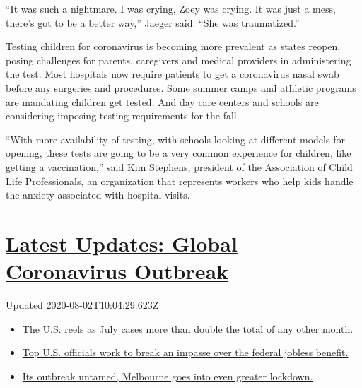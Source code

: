 ``It was such a nightmare. I was crying, Zoey was crying. It was just a
mess, there's got to be a better way,'' Jaeger said. ``She was
traumatized.''

Testing children for coronavirus is becoming more prevalent as states
reopen, posing challenges for parents, caregivers and medical providers
in administering the test. Most hospitals now require patients to get a
coronavirus nasal swab before any surgeries and procedures. Some summer
camps and athletic programs are mandating children get tested. And day
care centers and schools are considering imposing testing requirements
for the fall.

``With more availability of testing, with schools looking at different
models for opening, these tests are going to be a very common experience
for children, like getting a vaccination,'' said Kim Stephens, president
of the Association of Child Life Professionals, an organization that
represents workers who help kids handle the anxiety associated with
hospital visits.

\hypertarget{latest-updates-global-coronavirus-outbreak}{%
\section{\texorpdfstring{\href{https://www.nytimes.com/2020/08/01/world/coronavirus-covid-19.html?action=click\&pgtype=Article\&state=default\&region=MAIN_CONTENT_1\&context=storylines_live_updates}{Latest
Updates: Global Coronavirus
Outbreak}}{Latest Updates: Global Coronavirus Outbreak}}\label{latest-updates-global-coronavirus-outbreak}}

Updated 2020-08-02T10:04:29.623Z

\begin{itemize}
\tightlist
\item
  \href{https://www.nytimes.com/2020/08/01/world/coronavirus-covid-19.html?action=click\&pgtype=Article\&state=default\&region=MAIN_CONTENT_1\&context=storylines_live_updates\#link-34047410}{The
  U.S. reels as July cases more than double the total of any other
  month.}
\item
  \href{https://www.nytimes.com/2020/08/01/world/coronavirus-covid-19.html?action=click\&pgtype=Article\&state=default\&region=MAIN_CONTENT_1\&context=storylines_live_updates\#link-780ec966}{Top
  U.S. officials work to break an impasse over the federal jobless
  benefit.}
\item
  \href{https://www.nytimes.com/2020/08/01/world/coronavirus-covid-19.html?action=click\&pgtype=Article\&state=default\&region=MAIN_CONTENT_1\&context=storylines_live_updates\#link-2bc8948}{Its
  outbreak untamed, Melbourne goes into even greater lockdown.}
\end{itemize}

